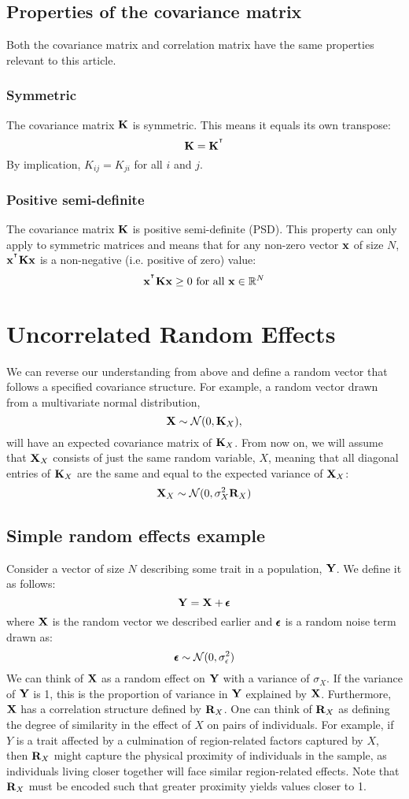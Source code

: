 \documentclass[12pt]{article}
\begin{document}
\subsection{Properties of the covariance matrix}
Both the covariance matrix and correlation matrix have the same properties relevant to this article.

\subsubsection{Symmetric}
The covariance matrix $\mathbf{K}$ is symmetric.
This means it equals its own transpose:
$$\mathbf{K} = \mathbf{K}^{^\intercal} $$
By implication, $K_{ij} = K_{ji}$ for all $i$ and $j$.

\subsubsection{Positive semi-definite}
The covariance matrix $\mathbf{K}$ is positive semi-definite (PSD).
This property can only apply to symmetric matrices and means that for any non-zero vector $\mathbf{x}$ of size $N$, $\mathbf{x}^{^\intercal} \mathbf{K} \mathbf{x} $ is a non-negative (i.e. positive of zero) value:
$$ \mathbf{x}^{^\intercal} \mathbf{K} \mathbf{x} \geq 0 \text{ for all } \mathbf{x} \in \mathbb{R}^N $$

\section{Uncorrelated Random Effects}
We can reverse our understanding from above and define a random vector that follows a specified covariance structure.
For example, a random vector drawn from a multivariate normal distribution,
$$ \mathbf{X} \sim \mathcal{N} (0, \mathbf{K}_X) , $$
will have an expected covariance matrix of $\mathbf{K}_X$.
From now on, we will assume that $\mathbf{X}_X$ consists of just the same random variable, $X$, meaning that all diagonal entries of $\mathbf{K}_X$ are the same and equal to the expected variance of $\mathbf{X}_X$:
$$ \mathbf{X}_X \sim \mathcal{N} (0,\sigma_X^2 \mathbf{R}_X) $$

\subsection{Simple random effects example}
Consider a vector of size $N$ describing some trait in a population, $\mathbf{Y}$.
We define it as follows:
$$\mathbf{Y} = \mathbf{X} + \pmb{\epsilon}$$
where $\mathbf{X}$ is the random vector we described earlier and $\pmb{\epsilon}$ is a random noise term drawn as:
$$ \pmb{\epsilon} \sim \mathcal{N} (0, \sigma_\epsilon^2)$$
We can think of $\mathbf{X}$ as a random effect on $\mathbf{Y}$ with a variance of $\sigma_X$.
If the variance of $\mathbf{Y}$ is 1, this is the proportion of variance in $\mathbf{Y}$ explained by $\mathbf{X}$.
Furthermore, $\mathbf{X}$ has a correlation structure defined by $\mathbf{R}_X$.
One can think of $\mathbf{R}_X$ as defining the degree of similarity in the effect of $X$ on pairs of individuals.
For example, if $Y$ is a trait affected by a culmination of region-related factors captured by $X$, then $\mathbf{R}_X$ might capture the physical proximity of individuals in the sample, as individuals living closer together will face similar region-related effects.
Note that $\mathbf{R}_X$ must be encoded such that greater proximity yields values closer to 1.
\end{document}
